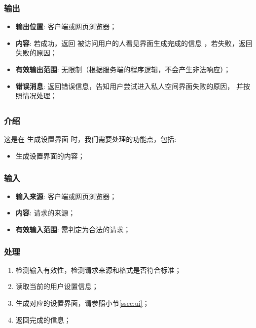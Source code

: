\begin{enumerate}
{\subsubsection{输出}
\begin{itemize}
	\item \textbf{输出位置}: 客户端或网页浏览器；
	\item \textbf{内容}: 若成功，返回 被访问用户的人看见界面生成完成的信息 ，若失败，返回 失败的原因；
	\item \textbf{有效输出范围}: 无限制（根据服务端的程序逻辑，不会产生非法响应）；
	\item \textbf{错误消息}: 返回错误信息，告知用户尝试进入私人空间界面失败的原因，
		并按照情况处理；
\end{itemize}
}
 
\subsection{}
\subsubsection{介绍}
	这是在 生成设置界面 时，我们需要处理的功能点，包括: 
	\begin{itemize}
		\item 生成设置界面的内容；
	\end{itemize}
\subsubsection{输入}
	\begin{itemize}
		\item \textbf{输入来源}: 客户端或网页浏览器；
		\item \textbf{内容}: 请求的来源；
		\item \textbf{有效输入范围}: 需判定为合法的请求；
	\end{itemize}
\subsubsection{处理}
	\begin{enumerate}
		\item 检测输入有效性，检测请求来源和格式是否符合标准；
		\item 读取当前的用户设置信息；
		\item 生成对应的设置界面，请参照小节\ref{ssec:ui}；
		\item 返回完成的信息；
	\end{enumerate}

\end{enumerate}
